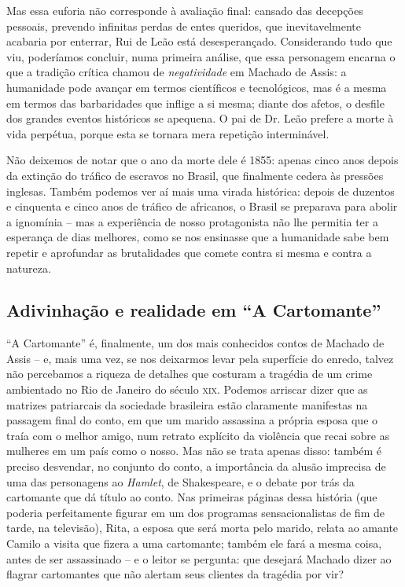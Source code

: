 \documentclass{extarticle}
\begin{document}
Mas essa euforia não corresponde à avaliação final: cansado das
decepções pessoais, prevendo infinitas perdas de entes queridos, que
inevitavelmente acabaria por enterrar, Rui de Leão está desesperançado.
Considerando tudo que viu, poderíamos concluir, numa primeira análise,
que essa personagem encarna o que a tradição crítica chamou de
\emph{negatividade} em Machado de Assis: a humanidade pode avançar em
termos científicos e tecnológicos, mas é a mesma em termos das
barbaridades que inflige a si mesma; diante dos afetos, o desfile dos
grandes eventos históricos se apequena. O pai de Dr. Leão prefere a
morte à vida perpétua, porque esta se tornara mera repetição
interminável.

Não deixemos de notar que o ano da morte dele é 1855: apenas cinco anos
depois da extinção do tráfico de escravos no Brasil, que finalmente
cedera às pressões inglesas. Também podemos ver aí mais uma virada
histórica: depois de duzentos e cinquenta e cinco anos de tráfico de
africanos, o Brasil se preparava para abolir a ignomínia -- mas a
experiência de nosso protagonista não lhe permitia ter a esperança de
dias melhores, como se nos ensinasse que a humanidade sabe bem repetir e
aprofundar as brutalidades que comete contra si mesma e contra a
natureza.

\subsection{Adivinhação e realidade em ``A Cartomante''}

``A Cartomante'' é, finalmente, um dos mais conhecidos contos de Machado
de Assis -- e, mais uma vez, se nos deixarmos levar pela superfície do
enredo, talvez não percebamos a riqueza de detalhes que costuram a
tragédia de um crime ambientado no Rio de Janeiro do século \textsc{xix}. Podemos
arriscar dizer que as matrizes patriarcais da sociedade brasileira estão
claramente manifestas na passagem final do conto, em que um marido
assassina a própria esposa que o traía com o melhor amigo, num retrato
explícito da violência que recai sobre as mulheres em um país como o
nosso. Mas não se trata apenas disso: também é preciso desvendar, no
conjunto do conto, a importância da alusão imprecisa de uma das
personagens ao \emph{Hamlet}, de Shakespeare, e o debate por trás da
cartomante que dá título ao conto. Nas primeiras páginas dessa história
(que poderia perfeitamente figurar em um dos programas sensacionalistas
de fim de tarde, na televisão), Rita, a esposa que será morta pelo
marido, relata ao amante Camilo a visita que fizera a uma cartomante;
também ele fará a mesma coisa, antes de ser assassinado -- e o leitor se
pergunta: que desejará Machado dizer ao flagrar cartomantes que não
alertam seus clientes da tragédia por vir?
\end{document}
